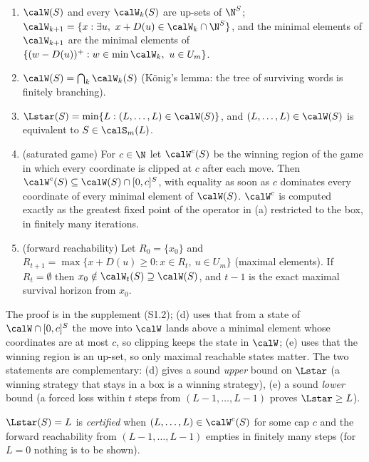 \begin{proposition}\label{prop:game}
\begin{enumerate}[label=(\alph*),leftmargin=2.2em,itemsep=1pt]
\item $\calW(S)$ and every $\calW_k(S)$ are up-sets of $\N^S$; $\calW_{k+1}=\{x:\exists u,\ x+D(u)\in\calW_k\cap\N^S\}$, and the minimal elements of $\calW_{k+1}$ are the minimal elements of $\{(w-D(u))^+:w\in\min\calW_k,\ u\in U_m\}$.
\item $\calW(S)=\bigcap_k\calW_k(S)$ (K\"onig's lemma: the tree of surviving words is finitely branching).
\item $\Lstar(S)=\min\{L:(L,\dots,L)\in\calW(S)\}$, and $(L,\dots,L)\in\calW(S)$ is equivalent to $S\in\calS_m(L)$.
\item (saturated game) For $c\in\N$ let $\calW^{c}(S)$ be the winning region of the game in which every coordinate is clipped at $c$ after each move. Then $\calW^{c}(S)\subseteq\calW(S)\cap[0,c]^S$, with equality as soon as $c$ dominates every coordinate of every minimal element of $\calW(S)$. $\calW^{c}$ is computed exactly as the greatest fixed point of the operator in (a) restricted to the box, in finitely many iterations.
\item (forward reachability) Let $R_0=\{x_0\}$ and $R_{t+1}=\max\{x+D(u)\ge0:x\in R_t,\ u\in U_m\}$ (maximal elements). If $R_t=\emptyset$ then $x_0\notin\calW_t(S)\supseteq\calW(S)$, and $t-1$ is the exact maximal survival horizon from $x_0$.
\end{enumerate}
\end{proposition}
The proof is in the supplement (S1.2); (d) uses that from a state of $\calW\cap[0,c]^S$ the move into $\calW$ lands above a minimal element whose coordinates are at most $c$, so clipping keeps the state in $\calW$; (e) uses that the winning region is an up-set, so only maximal reachable states matter. The two statements are complementary: (d) gives a sound \emph{upper} bound on $\Lstar$ (a winning strategy that stays in a box is a winning strategy), (e) a sound \emph{lower} bound (a forced loss within $t$ steps from $(L-1,\dots,L-1)$ proves $\Lstar\ge L$).

\begin{definition}
$\Lstar(S)=L$ is \emph{certified} when $(L,\dots,L)\in\calW^{c}(S)$ for some cap $c$ and the forward reachability from $(L-1,\dots,L-1)$ empties in finitely many steps (for $L=0$ nothing is to be shown).
\end{definition}

